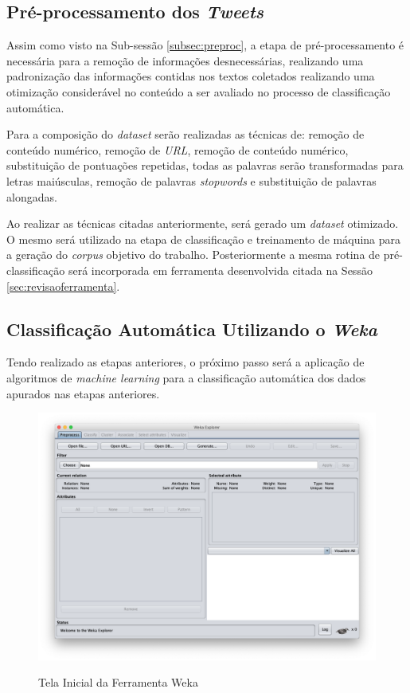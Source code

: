 \subsection{Pré-processamento dos \textit{Tweets}}
Assim como visto na Sub-sessão \ref{subsec:preproc}, a etapa de pré-processamento é necessária para a remoção de informações desnecessárias, realizando uma padronização das informações contidas nos textos coletados realizando uma otimização considerável no conteúdo a ser avaliado no processo de classificação automática. 

Para a composição do \textit{dataset} serão realizadas as técnicas de: remoção de conteúdo numérico, remoção de \textit{URL}, remoção de conteúdo numérico, substituição de pontuações repetidas, todas as palavras serão transformadas para letras maiúsculas, remoção de palavras \textit{stopwords} e substituição de palavras alongadas. 

Ao realizar as técnicas citadas anteriormente, será gerado um \textit{dataset} otimizado. O mesmo será utilizado na etapa de classificação e treinamento de máquina para a geração do \textit{corpus} objetivo do trabalho. Posteriormente a mesma rotina de pré-classificação será incorporada em ferramenta desenvolvida citada na Sessão \ref{sec:revisaoferramenta}.

\subsection{Classificação Automática Utilizando o \textit{Weka}}
Tendo realizado as etapas anteriores, o próximo passo será a aplicação de algoritmos de \textit{machine learning} para a classificação automática dos dados apurados nas etapas anteriores.


\begin{figure}[!h]
\centering 
\caption{Tela Inicial da Ferramenta Weka}
\includegraphics[scale=0.4]{imagens/wekatelainicial.png}
\label{fig:telaincialweka}
\end{figure}



